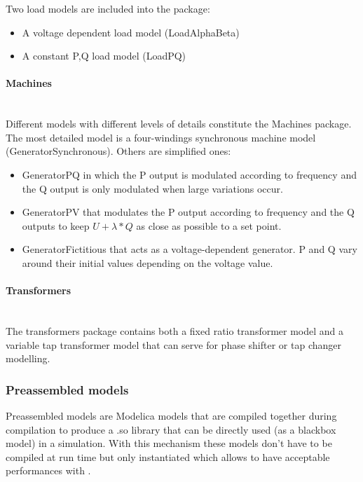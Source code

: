 \documentclass[a4paper, 12pt]{report}
\begin{document}
Two load models are included into the package:
\begin{itemize}
\item A voltage dependent load model (LoadAlphaBeta)
\item A constant P,Q load  model (LoadPQ)
\end{itemize}

\paragraph{Machines}
~~\\

Different models with different levels of details constitute the Machines package. The most detailed model is a four-windings synchronous machine model (GeneratorSynchronous). Others are simplified ones:
\begin{itemize}
\item GeneratorPQ in which the P output is modulated according to frequency and the Q output is only modulated when large variations occur.
\item GeneratorPV that modulates the P output according to frequency and the Q outputs to keep $U + \lambda * Q$ as close as possible to a set point.
\item GeneratorFictitious that acts as a voltage-dependent generator. P and Q vary around their initial values depending on the voltage value.
\end{itemize}

\paragraph{Transformers}
~~\\

The transformers package contains both a fixed ratio transformer model and a variable tap transformer model that can serve for phase shifter or tap changer modelling.

\subsubsection{Preassembled models}

Preassembled models are Modelica models that are compiled together during \Dynawo compilation to produce a .so library that can be directly used (as a blackbox model) in a simulation. With this mechanism these models don't have to be compiled at run time but only instantiated which allows to have acceptable performances with \Dynawo. \\
\end{document}
